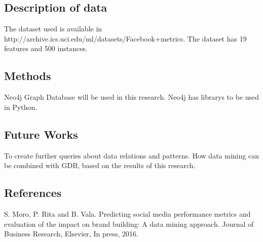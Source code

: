 \subsection{Description of data}\label{description-of-data}

The dataset used is available in
http://archive.ics.uci.edu/ml/datasets/Facebook+metrics. The dataset has
19 features and 500 instances.

\subsection{Methods}\label{methods}

Neo4j Graph Database will be used in this research. Neo4j has librarys
to be used in Python.

\subsection{Future Works}

To create further queries about data relations and patterns.
How data mining can be combined with GDB, based on the results of this research.

\subsection{References}\label{references}

S. Moro, P. Rita and B. Vala. Predicting social media performance
metrics and evaluation of the impact on brand building: A data mining
approach. Journal of Business Research, Elsevier, In press, 2016.

